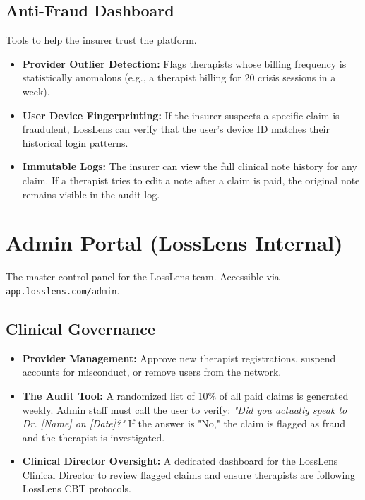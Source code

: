 \documentclass[11pt,a4paper]{article}
\begin{document}
\subsection{Anti-Fraud Dashboard}
Tools to help the insurer trust the platform.
\begin{itemize}
    \item \textbf{Provider Outlier Detection:} Flags therapists whose billing frequency is statistically anomalous (e.g., a therapist billing for 20 crisis sessions in a week).
    \item \textbf{User Device Fingerprinting:} If the insurer suspects a specific claim is fraudulent, LossLens can verify that the user's device ID matches their historical login patterns.
    \item \textbf{Immutable Logs:} The insurer can view the full clinical note history for any claim. If a therapist tries to edit a note after a claim is paid, the original note remains visible in the audit log.
\end{itemize}

\section{Admin Portal (LossLens Internal)}
The master control panel for the LossLens team. Accessible via \texttt{app.losslens.com/admin}.

\subsection{Clinical Governance}
\begin{itemize}
    \item \textbf{Provider Management:} Approve new therapist registrations, suspend accounts for misconduct, or remove users from the network.
    \item \textbf{The Audit Tool:} A randomized list of 10\% of all paid claims is generated weekly. Admin staff must call the user to verify: \textit{"Did you actually speak to Dr. [Name] on [Date]?"} If the answer is "No," the claim is flagged as fraud and the therapist is investigated.
    \item \textbf{Clinical Director Oversight:} A dedicated dashboard for the LossLens Clinical Director to review flagged claims and ensure therapists are following LossLens CBT protocols.
\end{itemize}
\end{document}
